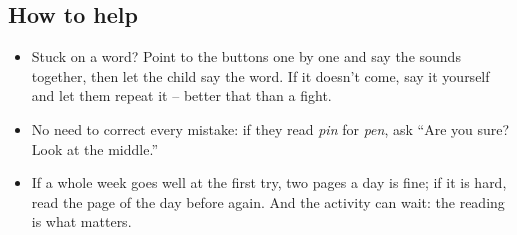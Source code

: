 \subsection*{How to help}

{\small
\begin{itemize}[leftmargin=6mm, itemsep=1pt, topsep=2pt]
\item Stuck on a word? Point to the buttons one by one and say the
  sounds together, then let the child say the word. If it doesn't come,
  say it yourself and let them repeat it -- better that than a fight.
\item No need to correct every mistake: if they read \textit{pin} for
  \textit{pen}, ask ``Are you sure? Look at the middle.''
\item If a whole week goes well at the first try, two pages a day is
  fine; if it is hard, read the page of the day before again. And the
  activity can wait: the reading is what matters.
\end{itemize}}
\newpage

